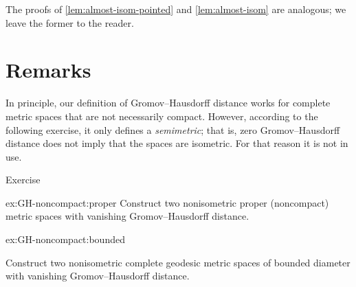 The proofs of \ref{lem:almost-isom-pointed} and \ref{lem:almost-isom} are analogous;
we leave the former to the reader.



\section{Remarks}

In principle, our definition of Gromov--Hausdorff distance works for complete metric spaces that are not necessarily compact.
However, according to the following exercise, it only defines a \emph{semimetric}; that is, zero Gromov--Hausdorff distance does not imply that the spaces are isometric.
For that reason it is not in use.

\begin{thm}{Exercise}\label{ex:GH-noncompact}
\begin{subthm}{ex:GH-noncompact:proper}
Construct two nonisometric proper (noncompact) metric spaces with vanishing Gromov--Hausdorff distance.
\end{subthm}

\begin{subthm}{ex:GH-noncompact:bounded}

Construct two nonisometric complete geodesic metric spaces of bounded diameter with vanishing Gromov--Hausdorff distance.
\end{subthm}


\end{thm}

